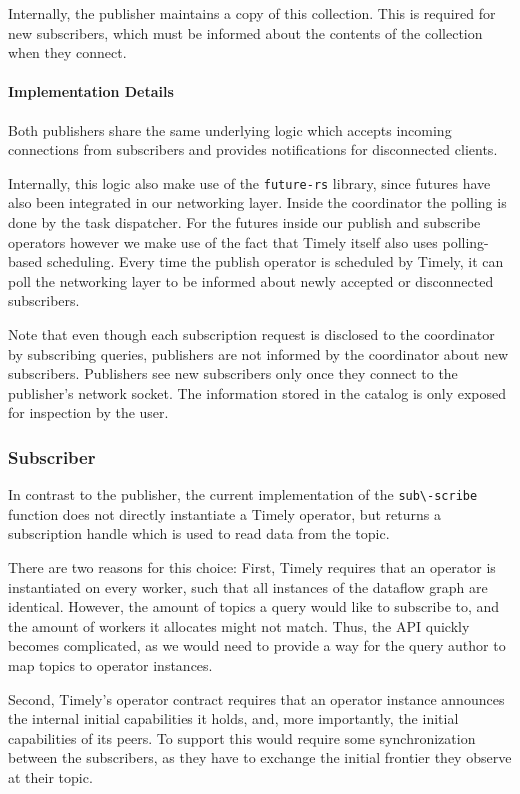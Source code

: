 Internally, the publisher maintains a copy of this collection. This is required
for new subscribers, which must be informed about the contents of the collection
when they connect.

\paragraph{Implementation Details}

Both publishers share the same underlying logic which accepts incoming connections
from subscribers and provides notifications for disconnected clients.

Internally, this logic also make use of the \lstinline{future-rs} library, 
since futures have also been integrated in our networking layer.
Inside the coordinator the polling is done by the task dispatcher. For the futures
inside our publish and subscribe operators however we make use of the fact
that Timely itself also uses polling-based scheduling. Every time the publish operator
is scheduled by Timely, it can poll the networking layer to be informed
about newly accepted or disconnected subscribers.

Note that even though each subscription request is disclosed to the coordinator
by subscribing queries, publishers are not informed by the coordinator about new subscribers. Publishers
see new subscribers only once they connect to the publisher's network socket. 
The information stored in the catalog is only exposed for inspection by the user.

\subsubsection{Subscriber}

In contrast to the publisher, the current implementation of the \lstinline{sub\-scribe}
function does not directly instantiate a Timely operator, but returns a subscription
handle which is used to read data from the topic.

There are two reasons for this choice: First, Timely requires that an operator
is instantiated on every worker, such that all instances of the dataflow graph
are identical. However, the amount of topics a query would like to subscribe
to, and the amount of workers it allocates might not match. Thus, the API
quickly becomes complicated, as we would need to provide a way for the 
query author to map topics to operator instances.

Second, Timely's operator contract requires that an operator instance announces
the internal initial capabilities it holds, and, more importantly, the initial
capabilities of its peers. To support this would require some synchronization
between the subscribers, as they have to exchange the initial frontier they
observe at their topic.

